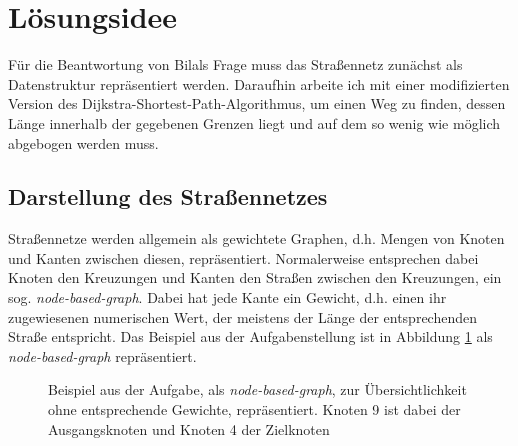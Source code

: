 \documentclass[a4paper,10pt,ngerman]{scrartcl}
\title{\Aufgabe}
\author{\Name\\Team-ID: \Einsendenummer}
\date{\today}
\begin{document}
\maketitle
\tableofcontents

\section{Lösungsidee}
\label{sec:idea}
Für die Beantwortung von Bilals Frage muss das Straßennetz zunächst als Datenstruktur repräsentiert werden.
Daraufhin arbeite ich mit einer modifizierten Version des Dijkstra-Shortest-Path-Algorithmus, um einen Weg zu finden, dessen Länge innerhalb der gegebenen Grenzen liegt und auf dem so wenig wie möglich abgebogen werden muss.

\subsection{Darstellung des Straßennetzes}
\label{sec:idea:representation}
Straßennetze werden allgemein als gewichtete Graphen, d.h. Mengen von Knoten und Kanten zwischen diesen, repräsentiert.
Normalerweise entsprechen dabei Knoten den Kreuzungen und Kanten den Straßen zwischen den Kreuzungen, ein sog. \textit{node-based-graph}.
Dabei hat jede Kante ein Gewicht, d.h. einen ihr zugewiesenen numerischen Wert, der meistens der Länge der entsprechenden Straße entspricht.
Das Beispiel aus der Aufgabenstellung ist in Abbildung \ref{fig:graph-idee} als \textit{node-based-graph} repräsentiert.

\begin{figure}
\centering
{}
\label{fig:graph-idee}
\caption{Beispiel aus der Aufgabe, als \textit{node-based-graph}, zur Übersichtlichkeit ohne entsprechende Gewichte, repräsentiert. Knoten 9 ist dabei der Ausgangsknoten und Knoten 4 der Zielknoten}
\end{figure}
\end{document}
